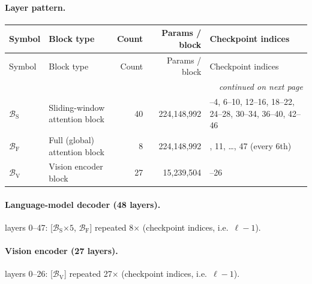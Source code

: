 \documentclass[10pt,a4paper]{article}
\theoremstyle{definition}
\begin{document}
\paragraph{Layer pattern.}
\begin{longtable}{l>{\raggedright\arraybackslash}p{5.6cm}rr>{\raggedright\arraybackslash}p{4.4cm}}
\toprule
Symbol & Block type & Count & Params / block & Checkpoint indices \\
\midrule
\endfirsthead
\toprule
Symbol & Block type & Count & Params / block & Checkpoint indices \\
\midrule
\endhead
\midrule \multicolumn{5}{r}{\textit{continued on next page}} \\
\endfoot
\bottomrule
\endlastfoot
$\mathcal{B}_{\mathrm{S}}$ & Sliding-window attention block & 40 & 224,148,992 & 0--4, 6--10, 12--16, 18--22, 24--28, 30--34, 36--40, 42--46 \\
$\mathcal{B}_{\mathrm{F}}$ & Full (global) attention block & 8 & 224,148,992 & 5, 11, \ldots, 47 (every 6th) \\
$\mathcal{B}_{\mathrm{V}}$ & Vision encoder block & 27 & 15,239,504 & 0--26 \\
\end{longtable}
\paragraph{Language-model decoder (48 layers).} 
layers 0--47: [$\mathcal{B}_{\mathrm{S}}$$\times5$, $\mathcal{B}_{\mathrm{F}}$] repeated 8$\times$ (checkpoint indices, i.e.\ $\ell-1$).
\paragraph{Vision encoder (27 layers).} 
layers 0--26: [$\mathcal{B}_{\mathrm{V}}$] repeated 27$\times$ (checkpoint indices, i.e.\ $\ell-1$).
\end{document}
